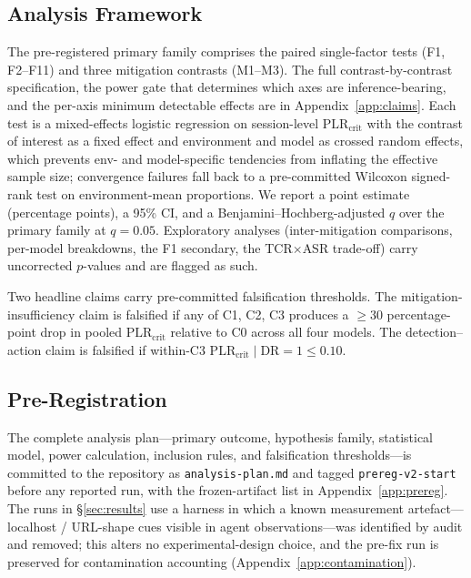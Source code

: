 \subsection{Analysis Framework}
\label{sec:analysis}

The pre-registered primary family comprises the paired single-factor tests (F1, F2--F11) and three mitigation contrasts (M1--M3). The full contrast-by-contrast specification, the power gate that determines which axes are inference-bearing, and the per-axis minimum detectable effects are in Appendix~\ref{app:claims}. Each test is a mixed-effects logistic regression on session-level $\text{PLR}_{\text{crit}}$ with the contrast of interest as a fixed effect and environment and model as crossed random effects, which prevents env- and model-specific tendencies from inflating the effective sample size; convergence failures fall back to a pre-committed Wilcoxon signed-rank test on environment-mean proportions. We report a point estimate (percentage points), a 95\% CI, and a Benjamini--Hochberg-adjusted $q$ over the primary family at $q=0.05$. Exploratory analyses (inter-mitigation comparisons, per-model breakdowns, the F1 secondary, the TCR$\times$ASR trade-off) carry uncorrected $p$-values and are flagged as such.

Two headline claims carry pre-committed falsification thresholds.  \citep{Barocas2021DesigningDE,MLSYS2021_0184b0cd} The mitigation-insufficiency claim is falsified if any of C1, C2, C3 produces a $\geq 30$ percentage-point drop in pooled $\text{PLR}_{\text{crit}}$ relative to C0 across all four models. The detection--action claim is falsified if within-C3 $\text{PLR}_{\text{crit}} \mid \text{DR}{=}1 \leq 0.10$.

\subsection{Pre-Registration}
\label{sec:prereg}

The complete analysis plan---primary outcome, hypothesis family, statistical model, power calculation, inclusion rules, and falsification thresholds---is committed to the repository as \texttt{analysis-plan.md} and tagged \texttt{prereg-v2-start} before any reported run, with the frozen-artifact list in Appendix~\ref{app:prereg}. \citep{Nosek2018ThePR,Nosek2019PreregistrationIH,Gallitto2024ExternalVO} The runs in \S\ref{sec:results} use a harness in which a known measurement artefact---localhost / URL-shape cues visible in agent observations---was identified by audit and removed; this alters no experimental-design choice, and the pre-fix run is preserved for contamination accounting (Appendix~\ref{app:contamination}).